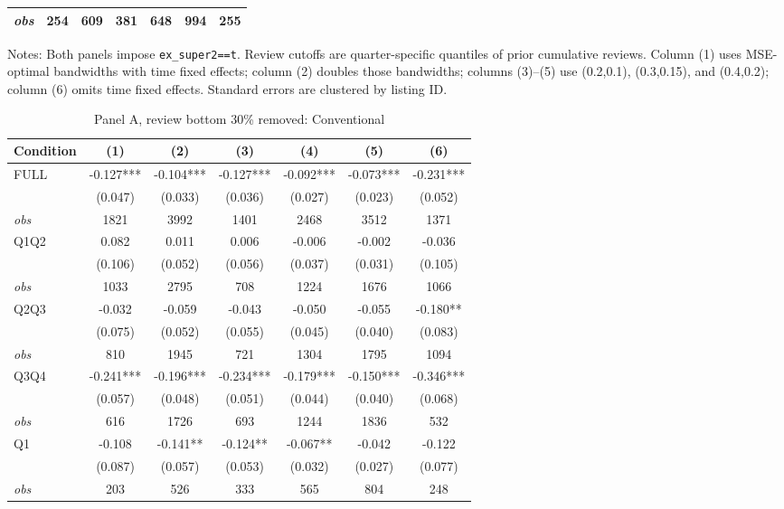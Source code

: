 \begin{table}[!htbp]
\begin{tabular}{lcccccc}
\textit{obs} & 254 & 609 & 381 & 648 & 994 & 255 \\
\bottomrule
\end{tabular}
\begin{minipage}{0.98\textwidth}\footnotesize
Notes: Both panels impose \texttt{ex\_super2==t}. Review cutoffs are quarter-specific quantiles of prior cumulative reviews. Column (1) uses MSE-optimal bandwidths with time fixed effects; column (2) doubles those bandwidths; columns (3)--(5) use (0.2,0.1), (0.3,0.15), and (0.4,0.2); column (6) omits time fixed effects. Standard errors are clustered by listing ID.
\end{minipage}
\end{table}

\begin{table}[!htbp]
\centering
\caption{Panel A, review bottom 30\% removed: Conventional}
\begin{tabular}{lcccccc}
\toprule
Condition & (1) & (2) & (3) & (4) & (5) & (6) \\
\midrule
FULL & -0.127*** & -0.104*** & -0.127*** & -0.092*** & -0.073*** & -0.231*** \\
 & (0.047) & (0.033) & (0.036) & (0.027) & (0.023) & (0.052) \\
\textit{obs} & 1821 & 3992 & 1401 & 2468 & 3512 & 1371 \\
Q1Q2 & 0.082 & 0.011 & 0.006 & -0.006 & -0.002 & -0.036 \\
 & (0.106) & (0.052) & (0.056) & (0.037) & (0.031) & (0.105) \\
\textit{obs} & 1033 & 2795 & 708 & 1224 & 1676 & 1066 \\
Q2Q3 & -0.032 & -0.059 & -0.043 & -0.050 & -0.055 & -0.180** \\
 & (0.075) & (0.052) & (0.055) & (0.045) & (0.040) & (0.083) \\
\textit{obs} & 810 & 1945 & 721 & 1304 & 1795 & 1094 \\
Q3Q4 & -0.241*** & -0.196*** & -0.234*** & -0.179*** & -0.150*** & -0.346*** \\
 & (0.057) & (0.048) & (0.051) & (0.044) & (0.040) & (0.068) \\
\textit{obs} & 616 & 1726 & 693 & 1244 & 1836 & 532 \\
Q1 & -0.108 & -0.141** & -0.124** & -0.067** & -0.042 & -0.122 \\
 & (0.087) & (0.057) & (0.053) & (0.032) & (0.027) & (0.077) \\
\textit{obs} & 203 & 526 & 333 & 565 & 804 & 248 \\

\end{tabular}
\end{table}

